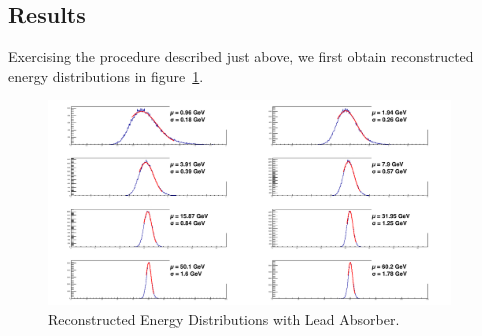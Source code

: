 \subsection{Results}
Exercising the procedure described just above, we first obtain reconstructed energy distributions in figure~\ref{fig:simulations_hgc_pbenergyreco}.
\begin{figure}[!h]
    \centering
    \includegraphics[width=0.95\textwidth]{figures/ch_simulations/hgc/performance/Pb/EnergyRECO.png}
    \caption{Reconstructed Energy Distributions with Lead Absorber.}
    \label{fig:simulations_hgc_pbenergyreco}
 \end{figure}

